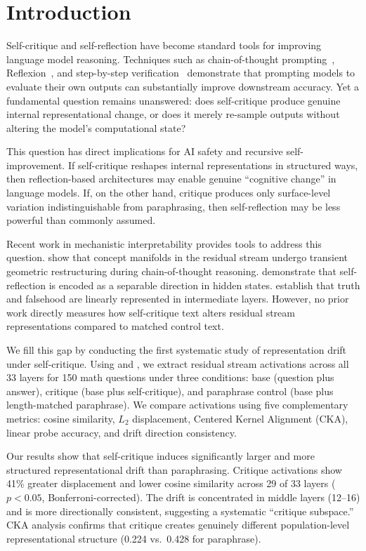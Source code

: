 \section{Introduction}
\label{sec:intro}

Self-critique and self-reflection have become standard tools for improving language model reasoning. Techniques such as chain-of-thought prompting~\citep{wei2022chain}, Reflexion~\citep{shinn2023reflexion}, and step-by-step verification~\citep{lightman2023lets} demonstrate that prompting models to evaluate their own outputs can substantially improve downstream accuracy. Yet a fundamental question remains unanswered: does self-critique produce genuine internal representational change, or does it merely re-sample outputs without altering the model's computational state?

This question has direct implications for AI safety and recursive self-improvement. If self-critique reshapes internal representations in structured ways, then reflection-based architectures may enable genuine ``cognitive change'' in language models. If, on the other hand, critique produces only surface-level variation indistinguishable from paraphrasing, then self-reflection may be less powerful than commonly assumed.

Recent work in mechanistic interpretability provides tools to address this question. \citet{polo2026emergent} show that concept manifolds in the residual stream undergo transient geometric restructuring during chain-of-thought reasoning. \citet{zhu2025emergence} demonstrate that self-reflection is encoded as a separable direction in hidden states. \citet{marks2024geometry} establish that truth and falsehood are linearly represented in intermediate layers. However, no prior work directly measures how self-critique text alters residual stream representations compared to matched control text.

We fill this gap by conducting the first systematic study of representation drift under self-critique. Using \pythia and \tlens, we extract residual stream activations across all 33 layers for 150 \gsm math questions under three conditions: base (question plus answer), critique (base plus self-critique), and paraphrase control (base plus length-matched paraphrase). We compare activations using five complementary metrics: cosine similarity, $L_2$ displacement, Centered Kernel Alignment (CKA), linear probe accuracy, and drift direction consistency.

Our results show that self-critique induces significantly larger and more structured representational drift than paraphrasing. Critique activations show 41\% greater displacement and lower cosine similarity across 29 of 33 layers ($p < 0.05$, Bonferroni-corrected). The drift is concentrated in middle layers (12--16) and is more directionally consistent, suggesting a systematic ``critique subspace.'' CKA analysis confirms that critique creates genuinely different population-level representational structure (0.224 vs.\ 0.428 for paraphrase).

